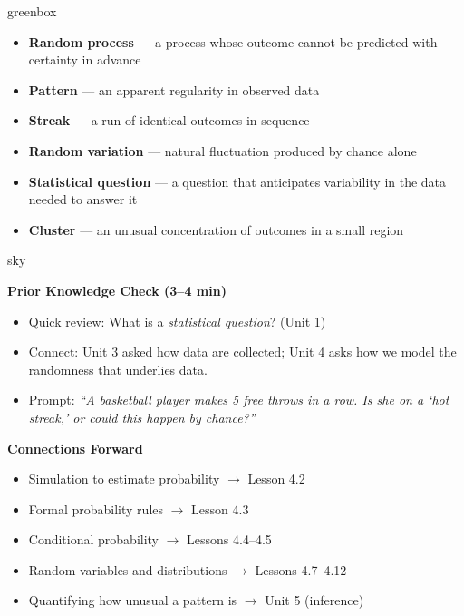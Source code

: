 \documentclass[10pt]{article}
\begin{document}
\begin{skillbox}{greenbox}
\begin{minipage}[t]{0.48\linewidth}
    \begin{itemize}
        \item \textbf{Random process} --- a process whose outcome cannot be predicted
              with certainty in advance
        \item \textbf{Pattern} --- an apparent regularity in observed data
        \item \textbf{Streak} --- a run of identical outcomes in sequence
    \end{itemize}
\end{minipage}
\hfill
\begin{minipage}[t]{0.48\linewidth}
    \begin{itemize}
        \item \textbf{Random variation} --- natural fluctuation produced by chance alone
        \item \textbf{Statistical question} --- a question that anticipates variability in
              the data needed to answer it
        \item \textbf{Cluster} --- an unusual concentration of outcomes in a small region
    \end{itemize}
\end{minipage}
\end{skillbox}

\begin{skillbox}{sky}
\begin{minipage}[t]{0.48\linewidth}
    \textbf{Prior Knowledge Check (3--4 min)}
    \begin{itemize}
        \item Quick review: What is a \emph{statistical question}? (Unit 1)
        \item Connect: Unit 3 asked how data are collected; Unit 4 asks how we model
              the randomness that underlies data.
        \item Prompt: \textit{``A basketball player makes 5 free throws in a row. Is she
              on a `hot streak,' or could this happen by chance?''}
    \end{itemize}
\end{minipage}
\hfill
\begin{minipage}[t]{0.48\linewidth}
    \textbf{Connections Forward}
    \begin{itemize}
        \item Simulation to estimate probability $\to$ Lesson 4.2
        \item Formal probability rules $\to$ Lesson 4.3
        \item Conditional probability $\to$ Lessons 4.4--4.5
        \item Random variables and distributions $\to$ Lessons 4.7--4.12
        \item Quantifying how unusual a pattern is $\to$ Unit 5 (inference)
    \end{itemize}
\end{minipage}
\end{skillbox}
\end{document}
